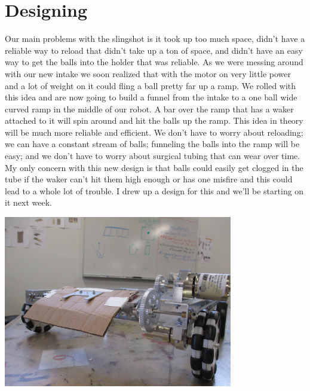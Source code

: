 \section*{Designing}
Our main problems with the slingshot is it took up too much space, didn’t have a reliable way to reload that didn’t take up a ton of space, and didn’t have an easy way to get the balls into the holder that was reliable. As we were messing around with our new intake we soon realized that with the motor on very little power and a lot of weight on it could fling a ball pretty far up a ramp. We rolled with this idea and are now going to build a funnel from the intake to a one ball wide curved ramp in the middle of our robot. A bar over the ramp that has a waker attached to it will spin around and hit the balls up the ramp. This idea in theory will be much more reliable and efficient. We don’t have to worry about reloading; we can have a constant stream of balls; funneling the balls into the ramp will be easy; and we don’t have to worry about surgical tubing that can wear over time. My only concern with this new design is that balls could easily get clogged in the tube if the waker can’t hit them high enough or has one misfire and this could lead to a whole lot of trouble. I drew up a design for this and we’ll be starting on it next week. 

\begin{center}
\includegraphics[width=10cm]{./Entries/Images/NewIntake.jpg}
\end{center}
